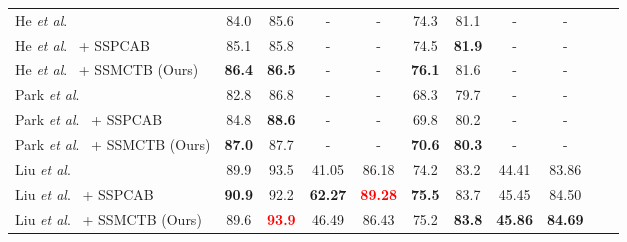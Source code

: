 \documentclass[10pt,journal,compsoc]{IEEEtran}
\newcommand{\etal}{\textit{et al}.}
\begin{document}
\begin{table*}[t]
\begin{tabular}{| l | c | c | c | c | c | c | c | c |  c | c |}
\hline
{He} \etal~\cite{He-CVPR-2022} & 84.0 & 85.6 & - & - & 74.3 & 81.1 & - & - \\ 
{He} \etal~\cite{He-CVPR-2022} + SSPCAB \cite{Ristea-CVPR-2022} & 85.1 & 85.8 & - & - & 74.5 & \textbf{81.9} & - & - \\ 
{He} \etal~\cite{He-CVPR-2022} + SSMCTB (Ours) & \textbf{86.4} & \textbf{86.5} & - & - & \textbf{76.1} & 81.6 & - & - \\ 
\hline
Park \etal~\cite{Park-CVPR-2020} & 82.8 & 86.8 & - & - & 68.3 & 79.7 & - & - \\ 
Park \etal~\cite{Park-CVPR-2020} + SSPCAB \cite{Ristea-CVPR-2022} & 84.8 & \textbf{88.6} & - & - & 69.8 & 80.2 & - & -  \\ 
Park \etal~\cite{Park-CVPR-2020} + SSMCTB (Ours) & \textbf{87.0} & 87.7 & - & - & \textbf{70.6} & \textbf{80.3} & - & - \\ 
 \hline
Liu \etal~\cite{Liu-ICCV-2021} & 89.9 & 93.5 & 41.05 & 86.18 & 74.2 & 83.2 & 44.41  & 83.86 \\ 
Liu \etal~\cite{Liu-ICCV-2021} + SSPCAB \cite{Ristea-CVPR-2022} &  \textbf{90.9} & 92.2 & \textbf{62.27} & \textcolor{red}{\textbf{89.28}} &  \textbf{75.5} & 83.7  & 45.45 & 84.50 \\ 
Liu \etal~\cite{Liu-ICCV-2021}  + SSMCTB (Ours) &  89.6 & \textcolor{red}{\textbf{93.9}} & 46.49 & 86.43 &  75.2 & \textbf{83.8}  & \textbf{45.86} & \textbf{84.69} \\


\end{tabular}
\end{table*}
\end{document}
